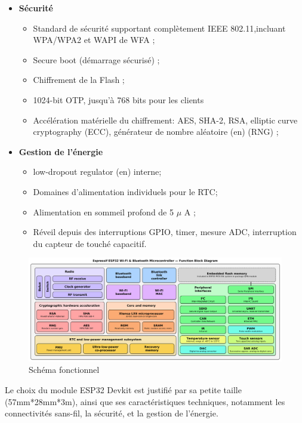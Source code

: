 \begin{itemize}
    \item[\textbullet]\textbf{Sécurité}   
        \begin{itemize}
            \item Standard de sécurité supportant complètement IEEE
                802.11,incluant WPA/WPA2 et WAPI de WFA ;
            \item Secure boot (démarrage sécurisé) ;
            \item Chiffrement de la Flash ;
            \item 1024-bit OTP, jusqu'à 768 bits pour les clients
            \item Accélération matérielle du chiffrement: AES, SHA-2, RSA,
                elliptic curve cryptography (ECC), générateur de nombre
                aléatoire (en) (RNG) ;
        \end{itemize}
    \item[\textbullet]\textbf{Gestion de l'énergie}

        \begin{itemize}
            \item low-dropout regulator (en) interne;
            \item Domaines d'alimentation individuels pour le RTC;
            \item Alimentation en sommeil profond de 5 $\mu$ A ;
            \item Réveil depuis des interruptions GPIO, timer, mesure ADC,
                interruption du capteur de touché capacitif.
        \end{itemize}
\end{itemize}


\begin{figure}[h!]
    \centering
    \includegraphics[scale=0.26 ]{images/esp32_fun.png}
    \caption{Schéma fonctionnel}
    \label{fig50}
\end{figure}

Le choix du module ESP32 Devkit est justifié par sa petite taille 
(57mm*28mm*3m), ainsi que ses caractéristiques techniques, notamment les
connectivités sans-fil, la sécurité, et la gestion de l’énergie\cite{33}.

